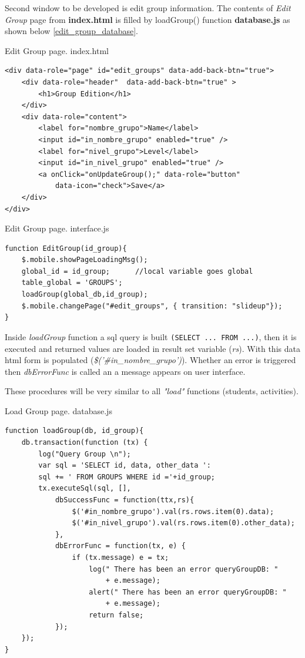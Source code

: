 Second window to be developed is edit group information. The contents of \textit{Edit Group} page from \textbf{index.html} is
filled by loadGroup() function \textbf{database.js} as shown below \ref{edit_group_database}.

\begin{bclogo}[couleur=blue!30,arrondi=0.1,ombre=true ] 
{Edit Group page. index.html }
\begin{verbatim}
<div data-role="page" id="edit_groups" data-add-back-btn="true">
    <div data-role="header"  data-add-back-btn="true" >
        <h1>Group Edition</h1>
    </div>
    <div data-role="content">
        <label for="nombre_grupo">Name</label>
        <input id="in_nombre_grupo" enabled="true" />
        <label for="nivel_grupo">Level</label>
        <input id="in_nivel_grupo" enabled="true" />
        <a onClick="onUpdateGroup();" data-role="button" 
            data-icon="check">Save</a>
	</div>
</div>
\end{verbatim}
\end{bclogo}

\begin{bclogo}[couleur=blue!30,arrondi=0.1,ombre=true ] 
{Edit Group page. interface.js}
\begin{verbatim}
function EditGroup(id_group){
    $.mobile.showPageLoadingMsg();
    global_id = id_group;      //local variable goes global
    table_global = 'GROUPS';
    loadGroup(global_db,id_group);
    $.mobile.changePage("#edit_groups", { transition: "slideup"});
}
\end{verbatim}
\end{bclogo}

Inside \textit{loadGroup} function a sql query is built \texttt{(SELECT ... FROM ...)}, then
it is executed and returned values are loaded in result set variable (\textit{rs}). 
With this data html form  is populated (\textit{\$('\#in\_nombre\_grupo')}). 
Whether an error is triggered then \textit{dbErrorFunc} is called an a message appears on user interface.

These procedures will be very similar to all \textit{"load"} functions (students, activities).

\begin{bclogo}[couleur=blue!30,arrondi=0.1,ombre=true ] 
{Load Group page. database.js  \label{edit_group_database}}
\begin{verbatim}
function loadGroup(db, id_group){
    db.transaction(function (tx) {
        log("Query Group \n");
        var sql = 'SELECT id, data, other_data ':
        sql += ' FROM GROUPS WHERE id ='+id_group;
        tx.executeSql(sql, [],
            dbSuccessFunc = function(ttx,rs){
                $('#in_nombre_grupo').val(rs.rows.item(0).data);
                $('#in_nivel_grupo').val(rs.rows.item(0).other_data);
            },
            dbErrorFunc = function(tx, e) {
                if (tx.message) e = tx;
                    log(" There has been an error queryGroupDB: " 
                        + e.message);
                    alert(" There has been an error queryGroupDB: " 
                        + e.message);
                    return false;
            });
    });
}
\end{verbatim}
\end{bclogo}


